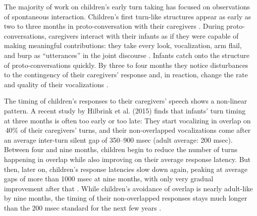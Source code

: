 \documentclass[authoryear, 12pt]{elsarticle}
\begin{document}
The majority of work on children's early turn taking has focused on observations of spontaneous interaction. Children's first turn-like structures appear as early as two to three months in proto-conversation with their caregivers \citep{bruner1975, bruner1985}. During proto-conversations, caregivers interact with their infants as if they were capable of making meaningful contributions: they take every look, vocalization, arm flail, and burp as ``utterances'' in the joint discourse \citep{bateson1975, jaffe2001, snow1977}. Infants catch onto the structure of proto-conversations quickly. By three to four months they notice disturbances to the contingency of their caregivers' response and, in reaction, change the rate and quality of their vocalizations \citep{k-bloom1988, masataka1993}. 




The timing of children's responses to their caregivers' speech shows a non-linear pattern. A recent study by Hilbrink et al. (2015) finds that infants' turn timing at three months is often too early or too late: They start vocalizing in overlap on $~$40\% of their caregivers' turns, and their non-overlapped vocalizations come after an average inter-turn silent gap of 350--900 msec (adult average: 200 msec). Between four and nine months, children begin to reduce the number of turns happening in overlap while also improving on their average response latency. But then, later on, children's response latencies slow down again, peaking at average gaps of more than 1000 msec at nine months, with only very gradual improvement after that \citep{hilbrink2015}. While children's avoidance of overlap is nearly adult-like by nine months, the timing of their non-overlapped responses stays much longer than the 200 msec standard for the next few years \citep{casillas2016, garvey1984, ervin-tripp1979}. 
\end{document}
